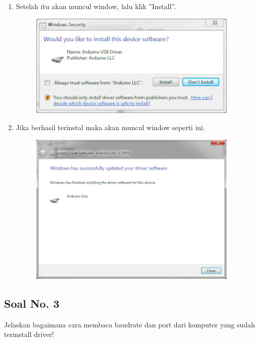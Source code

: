 \begin{enumerate}
\begin{figure}[H]
		\centering
	\end{figure}
	\item Setelah itu akan muncul window, lalu klik ''Install''.
	\begin{figure}[H]
		\includegraphics[width=10cm]{figures/5/1174086/Teori/9.png}
		\centering
	\end{figure}
	\item Jika berhasil terinstal maka akan muncul window seperti ini.
	\begin{figure}[H]
		\includegraphics[width=10cm]{figures/5/1174086/Teori/10.png}
		\centering
	\end{figure}
\end{enumerate}

\subsection{Soal No. 3}
Jelaskan bagaimana cara membaca baudrate dan port dari komputer yang sudah terinstall driver!

